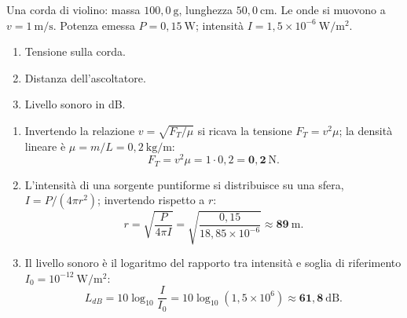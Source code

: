 \begin{question}[ID=5.1, subtitle={Corda di violino — tensione, distanza e livello sonoro}, tags={suono, intensità, livello sonoro}, difficulty=facile]
Una corda di violino: massa $100{,}0\ \mathrm{g}$, lunghezza $50{,}0\ \mathrm{cm}$. Le onde si muovono a $v = 1\ \mathrm{m/s}$. Potenza emessa $P = 0{,}15\ \mathrm{W}$; intensità $I = 1{,}5\times10^{-6}\ \mathrm{W/m^2}$.
\begin{enumerate}
\item Tensione sulla corda.
\item Distanza dell'ascoltatore.
\item Livello sonoro in dB.
\end{enumerate}
\begin{solution}
\begin{enumerate}
\item Invertendo la relazione $v = \sqrt{F_T/\mu}$ si ricava la tensione $F_T = v^2\mu$; la densità lineare è $\mu = m/L = 0{,}2\ \mathrm{kg/m}$:
\[
F_T = v^2\mu = 1\cdot 0{,}2 = \mathbf{0{,}2\ \mathrm{N}}.
\]
\item L'intensità di una sorgente puntiforme si distribuisce su una sfera, $I = P/(4\pi r^2)$; invertendo rispetto a $r$:
\[
r = \sqrt{\frac{P}{4\pi I}} = \sqrt{\frac{0{,}15}{18{,}85\times10^{-6}}} \approx \mathbf{89\ \mathrm{m}}.
\]
\item Il livello sonoro è il logaritmo del rapporto tra intensità e soglia di riferimento $I_0 = 10^{-12}\ \mathrm{W/m^2}$:
\[
L_{dB} = 10\log_{10}\frac{I}{I_0} = 10\log_{10}(1{,}5\times10^6) \approx \mathbf{61{,}8\ \mathrm{dB}}.
\]
\end{enumerate}
\end{solution}
\end{question}

